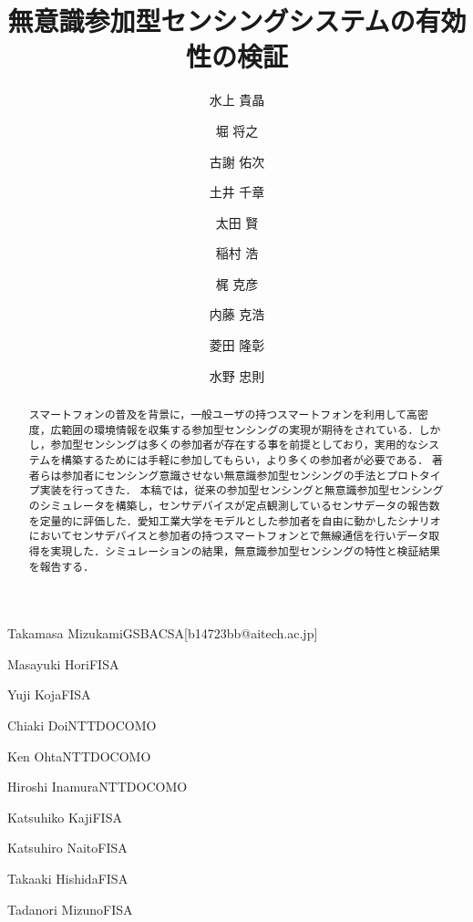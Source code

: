 \documentclass[submit,techrep]{ipsj}
\begin{document}
\title{無意識参加型センシングシステムの有効性の検証}






\author{水上 貴晶}{Takamasa Mizukami}{GSBACSA}[b14723bb@aitech.ac.jp]
\author{堀 将之}{Masayuki Hori}{FISA}%
\author{古謝 佑次}{Yuji Koja}{FISA}%
\author{土井 千章}{Chiaki Doi}{NTTDOCOMO}%
\author{太田 賢}{Ken Ohta}{NTTDOCOMO}%
\author{稲村 浩}{Hiroshi Inamura}{NTTDOCOMO}%
\author{梶 克彦}{Katsuhiko Kaji}{FISA}%
\author{内藤 克浩}{Katsuhiro Naito}{FISA}%
\author{菱田 隆彰}{Takaaki Hishida}{FISA}%
\author{水野 忠則}{Tadanori Mizuno}{FISA}%


\begin{abstract}
スマートフォンの普及を背景に，一般ユーザの持つスマートフォンを利用して高密度，広範囲の環境情報を収集する参加型センシングの実現が期待をされている．しかし，参加型センシングは多くの参加者が存在する事を前提としており，実用的なシステムを構築するためには手軽に参加してもらい，より多くの参加者が必要である．
著者らは参加者にセンシング意識させない無意識参加型センシングの手法とプロトタイプ実装を行ってきた．
本稿では，従来の参加型センシングと無意識参加型センシングのシミュレータを構築し，センサデバイスが定点観測しているセンサデータの報告数を定量的に評価した．愛知工業大学をモデルとした参加者を自由に動かしたシナリオにおいてセンサデバイスと参加者の持つスマートフォンとで無線通信を行いデータ取得を実現した．シミュレーションの結果，無意識参加型センシングの特性と検証結果を報告する．
\end{abstract}
\end{document}
